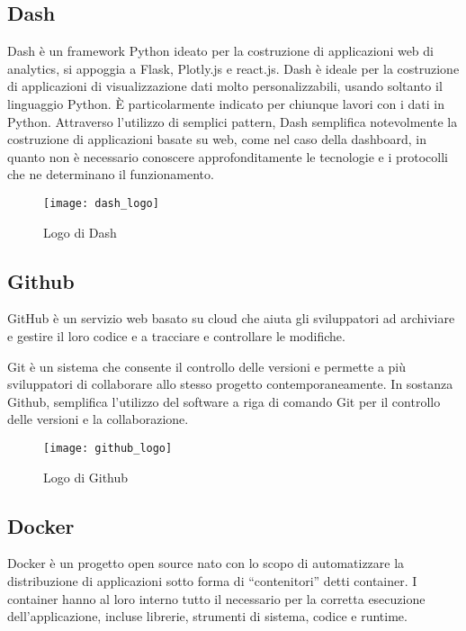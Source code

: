 \subsection{Dash}
Dash è un framework Python ideato per la costruzione di applicazioni web di analytics, si appoggia a Flask\footnotemark, Plotly.js e react.js\footnotemark.
Dash è ideale per la costruzione di applicazioni di visualizzazione dati molto personalizzabili, usando soltanto il linguaggio Python. 
È particolarmente indicato per chiunque lavori con i dati in Python.
Attraverso l’utilizzo di semplici pattern, Dash semplifica notevolmente la costruzione di applicazioni basate su web, come nel caso della dashboard, in quanto non è necessario conoscere approfonditamente le tecnologie e i protocolli che ne determinano il funzionamento.


\begin{figure}[htp]
    \centering
    \texttt{[image: dash\_logo]}
    \caption{Logo di Dash}
\end{figure}


\subsection{Github}
\noindent GitHub è un servizio web basato su cloud che aiuta gli sviluppatori ad archiviare e gestire il loro codice e a tracciare e controllare le modifiche.

\noindent Git è un sistema che consente il controllo delle versioni e permette a più sviluppatori di collaborare allo stesso progetto contemporaneamente.
\noindent In sostanza Github, semplifica l’utilizzo del software a riga di comando Git per il controllo delle versioni e la collaborazione.


\begin{figure}[htp]
    \centering
    \texttt{[image: github\_logo]}
    \caption{Logo di Github}
\end{figure}

\subsection{Docker}
\noindent Docker è un progetto open source nato con lo scopo di automatizzare la distribuzione di applicazioni sotto forma di “contenitori” detti container.
I container hanno al loro interno tutto il necessario per la corretta esecuzione dell’applicazione, incluse librerie, strumenti di sistema, codice e runtime.

